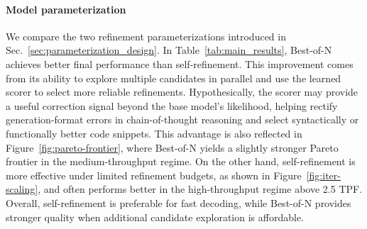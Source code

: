 \paragraph{Model parameterization}
We compare the two refinement parameterizations introduced in Sec.~\ref{sec:parameterization_design}. 
In Table~\ref{tab:main_results}, Best-of-N achieves better final performance than self-refinement. This improvement comes from its ability to explore multiple candidates in parallel and use the learned scorer to select more reliable refinements. 
Hypothesically, the scorer may provide a useful correction signal beyond the base model's likelihood, helping rectify generation-format errors in chain-of-thought reasoning and select syntactically or functionally better code snippets.
This advantage is also reflected in Figure~\ref{fig:pareto-frontier}, where Best-of-N yields a slightly stronger Pareto frontier in the medium-throughput regime. 
On the other hand, self-refinement is more effective under limited refinement budgets, as shown in Figure~\ref{fig:iter-scaling}, and often performs better in the high-throughput regime above 2.5 TPF. 
Overall, self-refinement is preferable for fast decoding, while Best-of-N provides stronger quality when additional candidate exploration is affordable.

